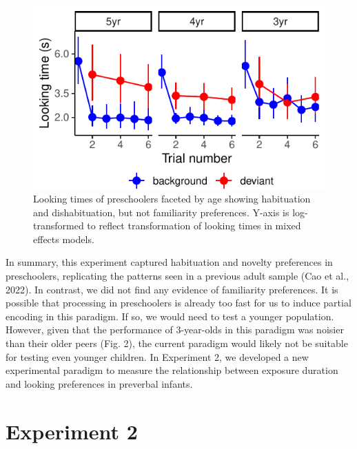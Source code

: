 \documentclass[10pt, letterpaper]{article}
\newenvironment{CodeChunk}{}{}
\begin{document}
\begin{CodeChunk}
\begin{figure}[t!]

\includegraphics{figs/unnamed-chunk-13-1} \hfill{}

\caption[Looking times of preschoolers faceted by age showing habituation and dishabituation, but not familiarity preferences]{Looking times of preschoolers faceted by age showing habituation and dishabituation, but not familiarity preferences. Y-axis is log-transformed to reflect transformation of looking times in mixed effects models.}\label{fig:unnamed-chunk-13}
\end{figure}
\end{CodeChunk}

In summary, this experiment captured habituation and novelty preferences
in preschoolers, replicating the patterns seen in a previous adult
sample (Cao et al., 2022). In contrast, we did not find any evidence of
familiarity preferences. It is possible that processing in preschoolers
is already too fast for us to induce partial encoding in this paradigm.
If so, we would need to test a younger population. However, given that
the performance of 3-year-olds in this paradigm was noisier than their
older peers (Fig. 2), the current paradigm would likely not be suitable
for testing even younger children. In Experiment 2, we developed a new
experimental paradigm to measure the relationship between exposure
duration and looking preferences in preverbal infants.

\hypertarget{experiment-2}{%
\section{Experiment 2}\label{experiment-2}}
\end{document}
